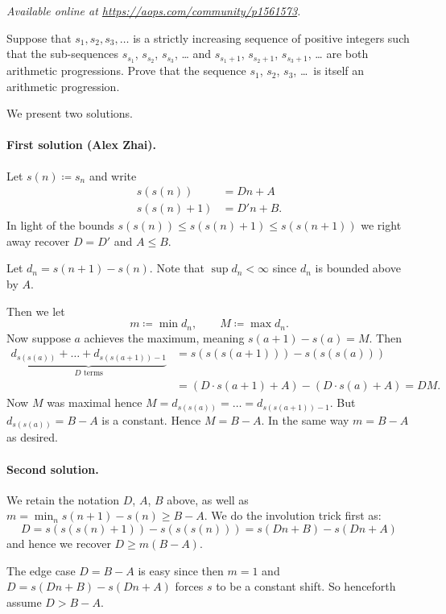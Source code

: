 \textsl{Available online at \url{https://aops.com/community/p1561573}.}
\begin{mdframed}[style=mdpurplebox,frametitle={Problem statement}]
Suppose that $s_1,s_2,s_3, \dotsc$ is a strictly increasing sequence of
positive integers such that the sub-sequences
$s_{s_1}$, $s_{s_2}$, $s_{s_3}$, \dots
and $s_{s_1 + 1}$, $s_{s_2 + 1}$, $s_{s_3 + 1}$, \dots
are both arithmetic progressions.
Prove that the sequence $s_1$, $s_2$, $s_3$, \dots\ is itself an arithmetic progression.
\end{mdframed}
We present two solutions.

\paragraph{First solution (Alex Zhai).}
Let $s(n) \coloneqq s_n$ and write
\begin{align*}
  s(s(n)) &= Dn + A \\
  s(s(n)+1) &= D'n + B.
\end{align*}
In light of the bounds $s(s(n)) \le s(s(n)+1) \le s(s(n+1))$
we right away recover $D = D'$ and $A \le B$.

Let $d_n = s(n+1)-s(n)$.
Note that $\sup d_n < \infty$ since $d_n$ is bounded above by $A$.

Then we let
\[ m \coloneqq \min d_n, \qquad M \coloneqq \max d_n. \]
Now suppose $a$ achieves the maximum, meaning $s(a+1)-s(a) = M$.
Then
\begin{align*}
  \underbrace{d_{s(s(a))} + \dots + d_{s(s(a+1))-1}}_{D \text{ terms}}
  &= \boxed{s(s(s(a+1))) - s(s(s(a)))} \\
  &= (D \cdot s(a+1) + A) - (D \cdot s(a) + A) = DM.
\end{align*}
Now $M$ was maximal hence $M = d_{s(s(a))} = \dots = d_{s(s(a+1))-1}$.
But $d_{s(s(a))} = B-A$ is a constant.
Hence $M = B-A$.
In the same way $m = B-A$ as desired.

\paragraph{Second solution.}
We retain the notation $D$, $A$, $B$ above,
as well as $m = \min_n s(n+1)-s(n) \ge B-A$.
We do the involution trick first as:
\[ D = \boxed{s(s(s(n)+1)) - s(s(s(n)))} = s(Dn+B) - s(Dn+A) \]
and hence we recover $D \ge m(B-A)$.

The edge case $D = B-A$ is easy since then $m=1$
and $D = s(Dn+B)-s(Dn+A)$ forces $s$ to be a constant shift.
So henceforth assume $D > B-A$.

